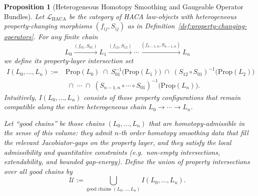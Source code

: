 \documentclass[11pt]{book}
\theoremstyle{plain}
\newtheorem{proposition}[theorem]{Proposition}
\theoremstyle{definition}
\theoremstyle{remark}
\begin{document}
\begin{proposition}[Heterogeneous Homotopy Smoothing and Gaugeable Operator Bundles]
\label{prop:gaugeable-operator-bundle-from-property-intersections}
Let $\mathcal{L}_{\mathrm{HACA}}$ be the category of HACA law-objects with
heterogeneous property-changing morphisms $(f_{ij},S_{ij})$ as in
Definition~\ref{def:property-changing-operators}. For any finite chain
\[
  L_0 \xrightarrow{(f_{01},S_{01})} L_1
      \xrightarrow{(f_{12},S_{12})} \cdots
      \xrightarrow{(f_{n-1,n},S_{n-1,n})} L_n
\]
we define its property-layer intersection set
\[
\begin{aligned}
I(L_0,\dots,L_n)
:={}& \mathrm{Prop}(L_0)
      \;\cap\;
      S_{01}^{-1}\bigl(\mathrm{Prop}(L_1)\bigr)
      \;\cap\;
      (S_{12}\circ S_{01})^{-1}\bigl(\mathrm{Prop}(L_2)\bigr) \\
 &\;\cap\;\cdots\;\cap\;
      (S_{n-1,n}\circ\cdots\circ S_{01})^{-1}
      \bigl(\mathrm{Prop}(L_n)\bigr).
\end{aligned}
\]
Intuitively, $I(L_0,\dots,L_n)$ consists of those property configurations
that remain compatible along the entire heterogeneous chain
$L_0\to\cdots\to L_n$.

Let ``good chains'' be those chains $(L_0,\dots,L_n)$ that are
homotopy-admissible in the sense of this volume: they admit $n$-th order
homotopy smoothing data that fill the relevant Jacobiator-gaps on the
property layer, and they satisfy the local admissibility and quantitative
constraints (e.g.\ non-empty intersections, extendability, and bounded
gap-energy). Define the union of property intersections over all good
chains by
\[
  \mathcal{U}
  :=
  \bigcup_{\text{good chains }(L_0,\dots,L_n)}
  I(L_0,\dots,L_n).
\]


\end{proposition}
\end{document}
